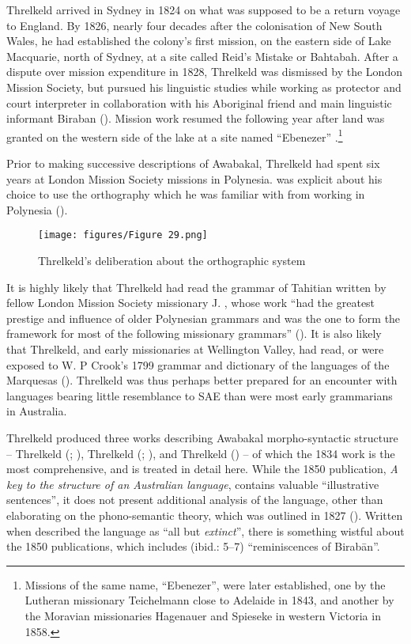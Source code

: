 Threlkeld arrived in Sydney in 1824 on what was supposed to be a return voyage to England. By 1826, nearly four decades after the colonisation of New South Wales, he had established the colony’s first mission, on the eastern side of Lake Macquarie, north of Sydney, at a site called Reid’s Mistake or Bahtabah. After a dispute over mission expenditure in 1828, Threlkeld was dismissed by the London Mission Society, but pursued his linguistic studies while working as protector and court interpreter in collaboration with his Aboriginal friend and main linguistic informant Biraban (). Mission work resumed the following year after land was granted on the western side of the lake at a site named ``Ebenezer'' \citep{gunson_australian_2016-1}.\footnote{Missions of the same name, “Ebenezer”, were later established, one by the Lutheran missionary Teichelmann close to Adelaide in 1843, and another by the Moravian missionaries Hagenauer and Spieseke in western Victoria in 1858.}

Prior to making successive descriptions of Awabakal, Threlkeld had spent six years at London Mission Society missions in Polynesia. \citet[vi]{threlkeld_australian_1834} was explicit about his choice to use the orthography which he was familiar with from working in Polynesia ().

\begin{figure}
\texttt{[image: figures/Figure 29.png]}
\caption{Threlkeld's deliberation about the orthographic system \citeyearpar[vi]{threlkeld_australian_1834}}
\label{fig:3:29}
\end{figure} 

\largerpage
It is highly likely that Threlkeld had read the grammar of Tahitian written by fellow London Mission Society missionary J. \citet{davies_grammar_1823}, whose work “had the greatest prestige and influence of older Polynesian grammars and was the one to form the framework for most of the following missionary grammars” (\citealt[109]{hovdhaugen_beginning_1993}). It is also likely that Threlkeld, and early missionaries at Wellington Valley, had read, or were exposed to W. P Crook’s 1799 grammar and dictionary of the languages of the Marquesas (). Threlkeld was thus perhaps better prepared for an encounter with languages bearing little resemblance to SAE than were most early grammarians in Australia.

Threlkeld produced three works describing Awabakal morpho-syntactic structure -- Threlkeld (\citeyear{threlkeld_specimens_1927}; ), Threlkeld (\citeyear{threlkeld_australian_1834}; ), and Threlkeld (\citeyear{threlkeld_key_1850}) -- of which the 1834 work is the most comprehensive, and is treated in detail here. While the 1850 publication, \textit{A key to the structure of an Australian language}, contains valuable “illustrative sentences”, it does not present additional analysis of the language, other than elaborating on the phono-semantic theory, which was outlined in 1827 (). Written when \citet[3]{threlkeld_key_1850} described the language as “all but \textit{extinct}”, there is something wistful about the 1850 publications, which includes (ibid.: 5--7) “reminiscences of Birabān”.

